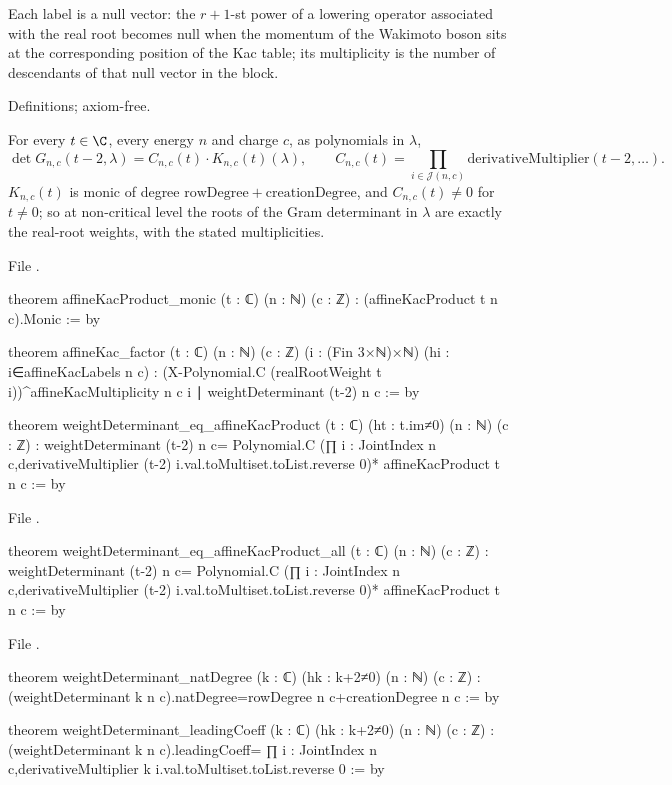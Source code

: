 \begin{physics}
Each label is a null vector: the $r+1$-st power of a lowering operator associated with the real root
becomes null when the momentum of the Wakimoto boson sits at the corresponding position of the Kac
table; its multiplicity is the number of descendants of that null vector in the block.
\end{physics}

\begin{status}
Definitions; axiom-free.
\end{status}

\begin{theorem}\label{l08:thm:kac}
For every $t\in\C$, every energy $n$ and charge $c$, as polynomials in $\lambda$,
\begin{equation*}
  \det G_{n,c}(t-2,\lambda) = C_{n,c}(t)\cdot K_{n,c}(t)(\lambda),\qquad
  C_{n,c}(t) = \prod_{i\in\mathcal J(n,c)}\mathrm{derivativeMultiplier}(t-2,\ldots).
\end{equation*}
$K_{n,c}(t)$ is monic of degree $\mathrm{rowDegree}+\mathrm{creationDegree}$, and $C_{n,c}(t)\ne0$ for $t\ne0$; so at
non-critical level the roots of the Gram determinant in $\lambda$ are exactly the real-root weights, with the
stated multiplicities.
\end{theorem}

\noindent File .
\begin{leancode}
theorem affineKacProduct_monic (t : ℂ) (n : ℕ) (c : ℤ) : (affineKacProduct t n c).Monic := by

theorem affineKac_factor (t : ℂ) (n : ℕ) (c : ℤ) (i : (Fin 3×ℕ)×ℕ)
    (hi : i∈affineKacLabels n c) :
    (X-Polynomial.C (realRootWeight t i))^affineKacMultiplicity n c i ∣ weightDeterminant (t-2) n c := by

theorem weightDeterminant_eq_affineKacProduct (t : ℂ) (ht : t.im≠0) (n : ℕ) (c : ℤ) :
    weightDeterminant (t-2) n c=
      Polynomial.C (∏ i : JointIndex n c,derivativeMultiplier (t-2) i.val.toMultiset.toList.reverse 0)*
        affineKacProduct t n c := by
\end{leancode}
\noindent File .
\begin{leancode}
theorem weightDeterminant_eq_affineKacProduct_all (t : ℂ) (n : ℕ) (c : ℤ) :
    weightDeterminant (t-2) n c=
      Polynomial.C (∏ i : JointIndex n c,derivativeMultiplier (t-2) i.val.toMultiset.toList.reverse 0)*
        affineKacProduct t n c := by
\end{leancode}
\noindent File .
\begin{leancode}
theorem weightDeterminant_natDegree (k : ℂ) (hk : k+2≠0) (n : ℕ) (c : ℤ) :
    (weightDeterminant k n c).natDegree=rowDegree n c+creationDegree n c := by

theorem weightDeterminant_leadingCoeff (k : ℂ) (hk : k+2≠0) (n : ℕ) (c : ℤ) :
    (weightDeterminant k n c).leadingCoeff=
      ∏ i : JointIndex n c,derivativeMultiplier k i.val.toMultiset.toList.reverse 0 := by
\end{leancode}

